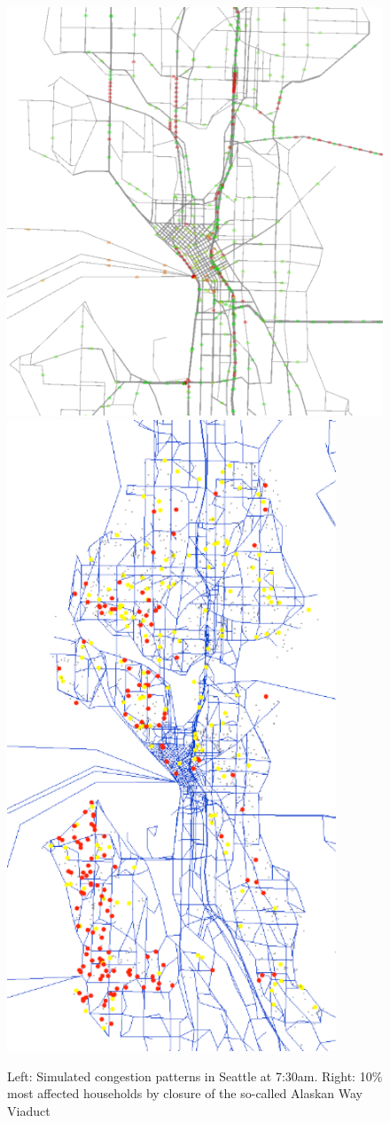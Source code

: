 \begin{figure}[!t!]
\centerline{%
\includegraphics[height=0.8\hsize,trim=0 0 0 0,clip]{using/figures/seattle-snapshot-7h30.pdf}
%
\includegraphics[height=0.8\hsize,trim=0 0 0 0,clip]{using/figures/seattle-top-10pct-0it.pdf}
}
\caption{Left: Simulated congestion patterns in Seattle at 7:30am.  Right: 10\% most affected households by closure of the so-called Alaskan Way Viaduct}
\label{fig:seattle-snapsho}
\end{figure}



